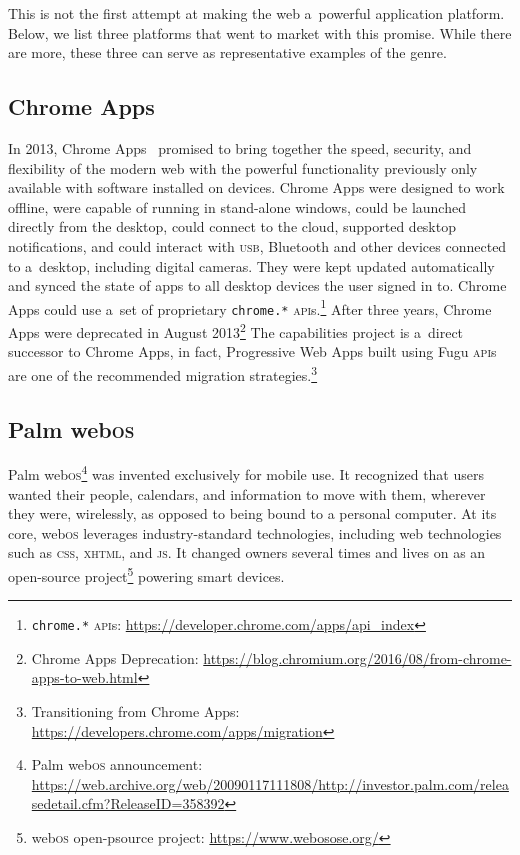 \documentclass[sigconf, anonymous]{acmart}
\begin{document}
This is not the first attempt at making the web a~powerful application platform.
Below, we list three platforms that went to market with this promise.
While there are more, these three can serve as representative examples of the genre.

\subsection{Chrome Apps}

In 2013, Chrome Apps~\cite{kay13} promised to bring together the speed, security,
and flexibility of the modern web with the powerful functionality
previously only available with software installed on devices. 
Chrome Apps were designed to work offline, were capable of running in stand-alone windows,
could be launched directly from the desktop,
could connect to the cloud, supported desktop notifications,
and could interact with \textsc{usb}, Bluetooth and other devices connected to a~desktop,
including digital cameras.
They were kept updated automatically and synced the state of apps
to all desktop devices the user signed in to.
Chrome Apps could use a~set of proprietary \texttt{chrome.*}
\textsc{api}s.\footnote{\texttt{chrome.*}
\textsc{api}s: \url{https://developer.chrome.com/apps/api_index}}
After three years, Chrome Apps were deprecated in August
2013\footnote{Chrome Apps Deprecation: \url{https://blog.chromium.org/2016/08/from-chrome-apps-to-web.html}}
The capabilities project is a~direct successor to Chrome Apps,
in fact, Progressive Web Apps built using Fugu \textsc{api}s
are one of the recommended migration
strategies.\footnote{Transitioning from Chrome Apps: \url{https://developers.chrome.com/apps/migration}}

\subsection{Palm web\textsc{os}}

Palm web\textsc{os}\footnote{Palm web\textsc{os} announcement:
\url{https://web.archive.org/web/20090117111808/http://investor.palm.com/releasedetail.cfm?ReleaseID=358392}}
was invented exclusively for mobile use.
It recognized that users wanted their people, calendars, and information to move with them,
wherever they were, wirelessly, as opposed to being bound to a personal computer.
At its core, web\textsc{os} leverages industry-standard technologies,
including web technologies such as \textsc{css}, \textsc{xhtml}, and \textsc{js}.
It changed owners several times and lives on as an open-source
project\footnote{web\textsc{os} open-psource project: \url{https://www.webosose.org/}}
powering smart devices.
\end{document}
